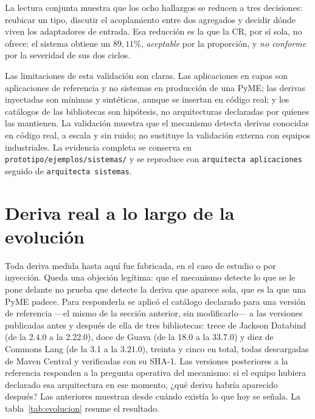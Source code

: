 La lectura conjunta muestra que los ocho hallazgos se reducen a tres decisiones: reubicar un tipo, discutir el acoplamiento entre dos agregados y decidir dónde viven los adaptadores de entrada. Esa reducción es la que la CR, por sí sola, no ofrece: el sistema obtiene un $89{,}11\%$, \textit{aceptable} por la proporción, y \textit{no conforme} por la severidad de sus dos ciclos.

Las limitaciones de esta validación son claras. Las aplicaciones en capas son aplicaciones de referencia y no sistemas en producción de una PyME; las derivas inyectadas son mínimas y sintéticas, aunque se insertan en código real; y los catálogos de las bibliotecas son hipótesis, no arquitecturas declaradas por quienes las mantienen. La validación muestra que el mecanismo detecta derivas conocidas en código real, a escala y sin ruido; no sustituye la validación externa con equipos industriales. La evidencia completa se conserva en \texttt{prototipo/ejemplos/sistemas/} y se reproduce con \texttt{arquitecta aplicaciones} seguido de \texttt{arquitecta sistemas}.

\section{Deriva real a lo largo de la evolución}
\label{sec:evolucion}
Toda deriva medida hasta aquí fue fabricada, en el caso de estudio o por inyección. Queda una objeción legítima: que el mecanismo detecte lo que se le pone delante no prueba que detecte la deriva que aparece sola, que es la que una PyME padece. Para responderla se aplicó el catálogo declarado para una versión de referencia ---el mismo de la sección anterior, sin modificarlo--- a las versiones publicadas antes y después de ella de tres bibliotecas: trece de Jackson Databind (de la 2.4.0 a la 2.22.0), doce de Guava (de la 18.0 a la 33.7.0) y diez de Commons Lang (de la 3.1 a la 3.21.0), treinta y cinco en total, todas descargadas de Maven Central y verificadas con su SHA-1. Las versiones posteriores a la referencia responden a la pregunta operativa del mecanismo: si el equipo hubiera declarado esa arquitectura en ese momento, ¿qué deriva habría aparecido después? Las anteriores muestran desde cuándo existía lo que hoy se señala. La tabla~\ref{tab:evolucion} resume el resultado.

